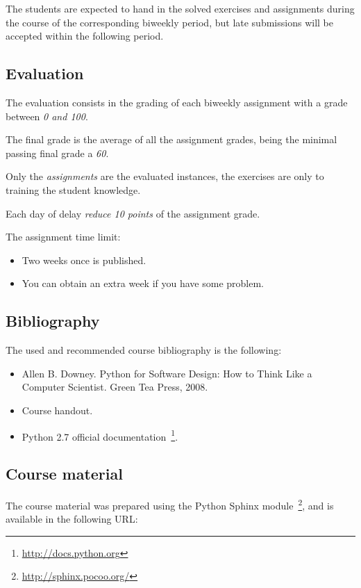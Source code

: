 \documentclass[letter, 10pt]{article}
\begin{document}
The students are expected to hand in the solved exercises and assignments
during the course of the corresponding biweekly period,
but late submissions will be accepted within the following period.

\subsection{Evaluation}

The evaluation consists in the grading of each biweekly assignment with
a grade between \emph{0 and 100}.

The final grade is the average of all the assignment grades,
being the minimal passing final grade a \emph{60}. 

Only the \emph{assignments} are the evaluated instances,
the exercises are only to training the student knowledge. 

Each day of delay \emph{reduce 10 points} of the assignment grade. 

The assignment time limit:
\begin{itemize}
    \item Two weeks once is published.
    \item You can obtain an extra week if you have some problem.
\end{itemize}

\subsection{Bibliography}

The used and recommended course bibliography is the following:

\begin{itemize}
    \item Allen B. Downey. Python for Software Design: How to Think Like a Computer Scientist. Green Tea Press, 2008.
    \item Course handout.
    \item Python 2.7 official documentation~\footnote{\url{http://docs.python.org}}.
\end{itemize}

\subsection{Course material}

The course material was prepared using the Python Sphinx module~\footnote{\url{http://sphinx.pocoo.org/}},
and is available in the following URL:
\end{document}
